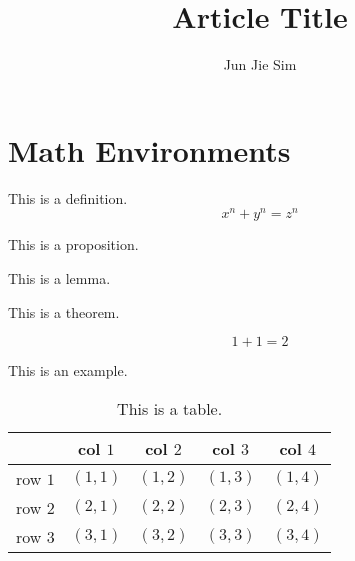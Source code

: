\documentclass[runningheads, a4paper]{llncs}
\begin{document}
	\title{Article Title}

	\author{
		Jun Jie Sim  
	}


	\maketitle

	\begin{abstract}

	\end{abstract}

	\section{Math Environments}

	\begin{definition}
		This is a definition. \label{def1}
		\[ x^n + y^n = z^n \label{eq1} \]
	\end{definition}

	\begin{proposition}
		This is a proposition. \label{prop1}
	\end{proposition}

	\begin{lemma}
		This is a lemma. \label{lemma1}
	\end{lemma}

	\begin{theorem}
		This is a theorem. \label{theorem1}
	\end{theorem}

	\[ 1+1=2 \label{eq3} \]

	\begin{example}
		This is an example. \label{eg1}
	\end{example}

	\begin{table}
		\centering
		\begin{tabular}{lcccc}
			\toprule
			& col $1$ & col $2$ & col $3$ & col  $4$ \\
			\midrule
			row $1$ & $(1,1)$ & $(1,2)$ & $(1,3)$ & $(1,4)$ \\
			row $2$ & $(2,1)$ & $(2,2)$ & $(2,3)$ & $(2,4)$ \\
			row $3$ & $(3,1)$ & $(3,2)$ & $(3,3)$ & $(3,4)$ \\
			\bottomrule
		\end{tabular}
		\caption{This is a table.}
		\label{table1}
	\end{table}
\end{document}
